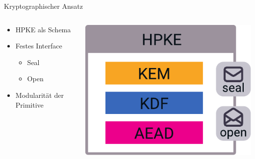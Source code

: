 \begin{frame}[c]{Kryptographischer Ansatz}
  \begin{columns}[fullwidth,c]
    \begin{column}{.65\linewidth}
      \begin{itemize}
        \item HPKE als Schema

        \item Festes Interface
        \begin{itemize}
          \item Seal
          \item Open
        \end{itemize}

        \item Modularität der Primitive

      \end{itemize}
    \end{column}%
    \begin{column}{.35\linewidth}
        \includegraphics[width=0.8\linewidth]{graphics/hpke}
    \end{column}
  \end{columns}
\end{frame}


